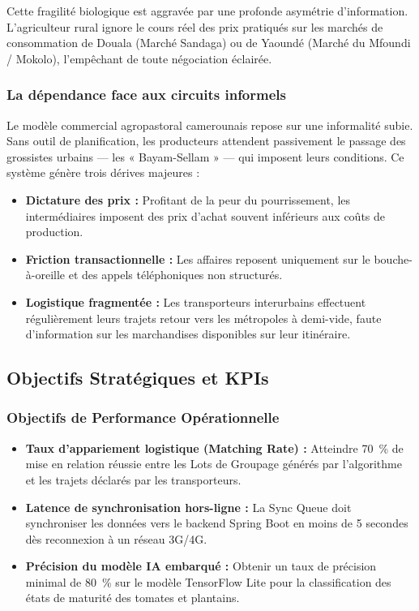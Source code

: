\documentclass[12pt,a4paper]{report}
\begin{document}
Cette fragilité biologique est aggravée par une profonde asymétrie d'information. L'agriculteur rural ignore le cours réel des prix pratiqués sur les marchés de consommation de Douala (Marché Sandaga) ou de Yaoundé (Marché du Mfoundi / Mokolo), l'empêchant de toute négociation éclairée.

\subsubsection{La dépendance face aux circuits informels}

Le modèle commercial agropastoral camerounais repose sur une informalité subie. Sans outil de planification, les producteurs attendent passivement le passage des grossistes urbains — les « Bayam-Sellam » — qui imposent leurs conditions. Ce système génère trois dérives majeures :

\begin{itemize}
  \item \textbf{Dictature des prix :} Profitant de la peur du pourrissement, les intermédiaires imposent des prix d'achat souvent inférieurs aux coûts de production.
  \item \textbf{Friction transactionnelle :} Les affaires reposent uniquement sur le bouche-à-oreille et des appels téléphoniques non structurés.
  \item \textbf{Logistique fragmentée :} Les transporteurs interurbains effectuent régulièrement leurs trajets retour vers les métropoles à demi-vide, faute d'information sur les marchandises disponibles sur leur itinéraire.
\end{itemize}

\subsection{Objectifs Stratégiques et KPIs}

\subsubsection{Objectifs de Performance Opérationnelle}

\begin{itemize}
  \item \textbf{Taux d'appariement logistique (Matching Rate) :} Atteindre 70~\% de mise en relation réussie entre les Lots de Groupage générés par l'algorithme et les trajets déclarés par les transporteurs.
  \item \textbf{Latence de synchronisation hors-ligne :} La Sync Queue doit synchroniser les données vers le backend Spring Boot en moins de 5 secondes dès reconnexion à un réseau 3G/4G.
  \item \textbf{Précision du modèle IA embarqué :} Obtenir un taux de précision minimal de 80~\% sur le modèle TensorFlow Lite pour la classification des états de maturité des tomates et plantains.
\end{itemize}
\end{document}
